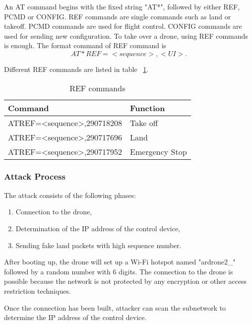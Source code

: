 \documentclass{acm_proc_article-sp}
\begin{document}
An AT command begins with the fixed string "AT*", followed by either REF, PCMD or CONFIG. REF commands are single commands such as land or takeoff. PCMD commands are used for flight control. CONFIG commands are used for sending new configuration. To take over a drone, using REF commands is enough. The format command of REF command is 
\begin{equation}
  AT*REF=<sequence>,<UI>.
\end{equation}


Different REF commands are listed in table ~\ref{refcom}.

\begin{table}
\centering
\caption{REF commands}
\label{refcom}
\begin{tabular}{@{}ll@{}} \hline
Command                                            & Function       \\ \hline
AT\*REF=\textless{}sequence\textgreater{},290718208 & Take off       \\ \hline
AT\*REF=\textless{}sequence\textgreater{},290717696 & Land           \\ \hline
AT\*REF=\textless{}sequence\textgreater{},290717952 & Emergency Stop \\ \hline
\end{tabular}
\end{table}


\subsubsection{Attack Process}

The attack consists of the following phases:

\begin{enumerate}
  \item Connection to the drone,
  \item Determination of the IP address of the control device,
  \item Sending fake land packets with high sequence number.
\end{enumerate}

After booting up, the drone will set up a Wi-Fi hotspot named "ardrone2\_" followed by a random number with 6 digits. The connection to the drone is possible because the network is not protected by any encryption or other access restriction techniques.

Once the connection has been built, attacker can scan the subnetwork to determine the IP address of the control device.
\end{document}
